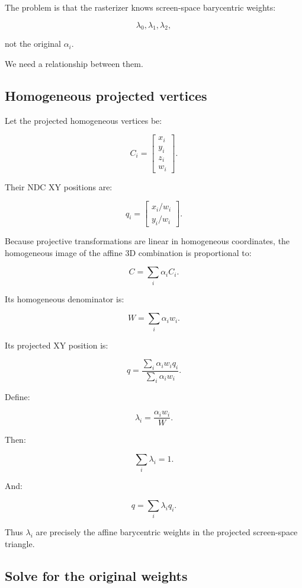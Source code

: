 The problem is that the rasterizer knows screen-space barycentric weights:

\[
 \lambda_0,\lambda_1,\lambda_2,
\]

not the original \(\alpha_i\).

We need a relationship between them.

\subsection{Homogeneous projected vertices}\label{02-foundations-ii-ch034-homogeneous-projected-vertices}

Let the projected homogeneous vertices be:

\[
 C_i= \begin{bmatrix} x_i\\y_i\\z_i\\w_i \end{bmatrix}.
\]

Their NDC XY positions are:

\[
 q_i= \begin{bmatrix} x_i/w_i\\ y_i/w_i \end{bmatrix}.
\]

Because projective transformations are linear in homogeneous coordinates, the homogeneous image of the affine 3D combination is proportional to:

\[
 \boxed{ C=\sum_i\alpha_iC_i }.
\]

Its homogeneous denominator is:

\[
 \boxed{ W=\sum_i\alpha_iw_i }.
\]

Its projected XY position is:

\[
 q= \frac{ \sum_i\alpha_iw_iq_i }{ \sum_i\alpha_iw_i }.
\]

Define:

\[
 \boxed{ \lambda_i=\frac{\alpha_iw_i}{W} }.
\]

Then:

\[
 \sum_i\lambda_i=1.
\]

And:

\[
 q=\sum_i\lambda_iq_i.
\]

Thus \(\lambda_i\) are precisely the affine barycentric weights in the projected screen-space triangle.

\subsection{Solve for the original weights}\label{02-foundations-ii-ch034-solve-for-the-original-weights}

